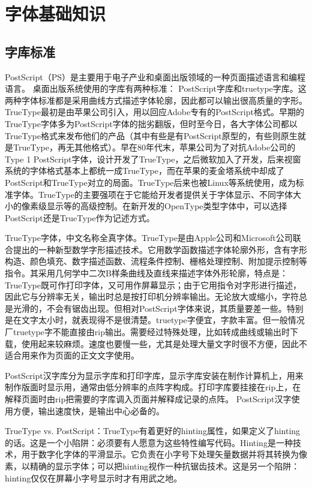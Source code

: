 \section{字体基础知识}

\subsection{字库标准}
PostScript（PS）是主要用于电子产业和桌面出版领域的一种页面描述语言和编程语言。
桌面出版系统使用的字库有两种标准： PostScript字库和truetype字库。这两种字体标准都是采用曲线方式描述字体轮廓，因此都可以输出很高质量的字形。TrueType最初是由苹果公司引入，用以回应Adobe专有的PostScript格式。早期的TrueType字体多为PostScript字体的拙劣翻版，但时至今日，各大字体公司都以TrueType格式来发布他们的产品（其中有些是有PostScript原型的，有些则原生就是TrueType，再无其他格式）。早在80年代末，苹果公司为了对抗Adobe公司的Type 1 PostScript字体，设计开发了TrueType，之后微软加入了开发，后来视窗系统的字体格式基本上都统一成TrueType，而在苹果的麦金塔系统中却成了PostScript和TrueType对立的局面。TrueType后来也被Linux等系统使用，成为标准字体。TrueType的主要强项在于它能给开发者提供关于字体显示、不同字体大小的像素级显示等的高级控制。在新开发的OpenType类型字体中，可以选择PostScript还是TrueType作为记述方式。

TrueType字体，中文名称全真字体。TrueType是由Apple公司和Microsoft公司联合提出的一种新型数学字形描述技术。它用数学函数描述字体轮廓外形，含有字形构造、颜色填充、数字描述函数、流程条件控制、栅格处理控制、附加提示控制等指令。其采用几何学中二次B样条曲线及直线来描述字体外形轮廓，特点是：TrueType既可作打印字体，又可用作屏幕显示；由于它用指令对字形进行描述，因此它与分辨率无关，输出时总是按打印机分辨率输出。无论放大或缩小，字符总是光滑的，不会有锯齿出现。但相对PostScript字体来说，其质量要差一些。特别是在文字太小时，就表现得不是很清楚。truetype字便宜，字款丰富。但一般情况厂truetype字不能直接由rip输出。需要经过特殊处理，比如转成曲线或输出时下载，使用起来较麻烦。速度也要慢一些，尤其是处理大量文字时很不方便，因此不适合用来作为页面的正文文字使用。

PostScript汉字库分为显示字库和打印字库，显示字库安装在制作计算机上，用来制作版面时显示用，通常由低分辨率的点阵字构成。打印字库要挂接在rip上，在解释页面时由rip把需要的字库调入页面并解释成记录的点阵。 PostScript汉字使用方便，输出速度快，是输出中心必备的。

TrueType vs. PostScript：TrueType有着更好的hinting属性，如果定义了hinting的话。这是一个小陷阱：必须要有人愿意为这些特性编写代码。Hinting是一种技术，用于数字化字体的平滑显示。它负责在小字号下处理矢量数据并将其转换为像素，以精确的显示字体；可以把hinting视作一种抗锯齿技术。这是另一个陷阱：hinting仅仅在屏幕小字号显示时才有用武之地。

